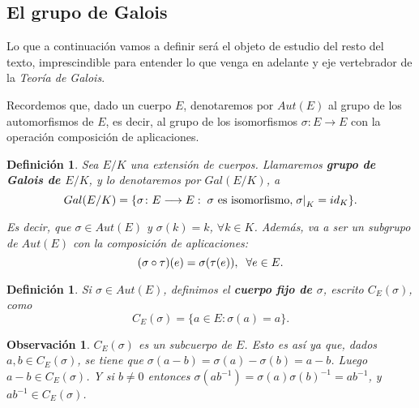 \documentclass[12pt]{article}
\newtheorem{definition}[theorem]{Definición}
\newtheorem{observation}{Observación}[theorem]
\begin{document}
\subsection{El grupo de Galois}
Lo que a continuación vamos a definir será el objeto de estudio del resto del texto, imprescindible para entender lo que venga en adelante y eje vertebrador de la \textit{Teoría de Galois}.

Recordemos que, dado un cuerpo $E$, denotaremos por $Aut(E)$ al grupo de los automorfismos de $E$, es decir, al grupo de los isomorfismos $\sigma \colon E \longrightarrow E$ con la operación composición de aplicaciones.

\begin{definition} Sea $E/K$ una extensión de cuerpos. Llamaremos \textbf{grupo de Galois de $E/K$}, y lo denotaremos por $Gal(E/K)$, a $$Gal(E/K) = \lbrace \sigma \colon E \longrightarrow E:\hspace{0.1cm} \sigma\text{ es isomorfismo}, \left.\sigma \right|_K  = id_{K} \rbrace.$$

Es decir, que $\sigma \in Aut(E)$ y $\sigma(k) = k$, $\forall k \in K$. Además, va a ser un subgrupo de $Aut(E)$ con la composición de aplicaciones: $$(\sigma \circ \tau) (e) = \sigma (\tau (e)), \hspace{0.2cm} \forall e \in E.$$
\end{definition}

\begin{definition}Si $\sigma \in Aut(E)$, definimos el \textbf{cuerpo fijo de $\sigma$}, escrito $C_{E}(\sigma)$, como $$C_{E}(\sigma) = \lbrace a \in E: \sigma (a) = a \rbrace.$$
\end{definition}

\begin{observation}$C_{E}(\sigma)$ es un subcuerpo de $E$. Esto es así ya que, dados $a,b \in C_{E}(\sigma)$, se tiene que $\sigma(a-b) = \sigma(a) -\sigma(b) = a-b$. Luego $a-b \in C_{E}(\sigma)$. Y si $b\neq 0$ entonces $\sigma(ab^{-1}) = \sigma(a) \sigma(b)^{-1} = ab^{-1}$, y $ab^{-1} \in C_{E}(\sigma)$.
\end{observation}
\end{document}
